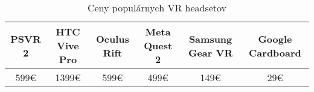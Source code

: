 \begin{table}[hbt!]
	\resizebox{\textwidth}{!}
	{
	\begin{tabular}{|c|c|c|c|c|c|}
		\hline
		\textbf{PSVR 2\footnotemark[1]} &
		\textbf{HTC Vive Pro\footnotemark[2]} &
		\textbf{Oculus Rift\footnotemark[2]} &
		\textbf{Meta Quest 2\footnotemark[2]} &
		\textbf{Samsung Gear VR\footnotemark[3]} &
		\textbf{Google Cardboard\footnotemark[3]} \\ \hline
		599€&1399€&599€&499€&149€&29€\\ \hline
		\end{tabular}
	}
	\caption{Ceny populárnych VR headsetov}
\end{table}